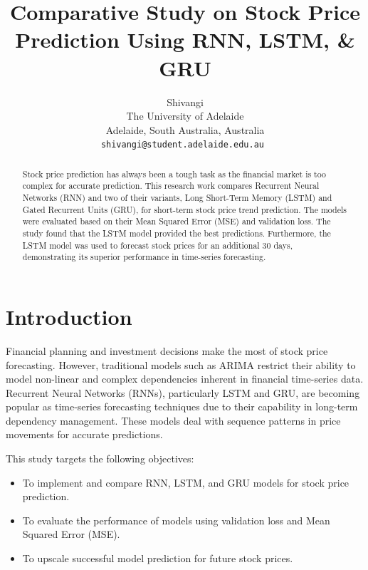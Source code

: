 \documentclass[10pt,twocolumn,a4paper]{article}
\begin{document}
\title{Comparative Study on Stock Price Prediction Using RNN, LSTM, \& GRU}

\author{
    Shivangi \\
    The University of Adelaide \\
    Adelaide, South Australia, Australia \\
    \tt\small shivangi@student.adelaide.edu.au
}

\date{}
\maketitle

\begin{abstract}
    Stock price prediction has always been a tough task as the financial market is too complex for accurate prediction. This research work compares Recurrent Neural Networks (RNN) and two of their variants, Long Short-Term Memory (LSTM) and Gated Recurrent Units (GRU), for short-term stock price trend prediction. The models were evaluated based on their Mean Squared Error (MSE) and validation loss. The study found that the LSTM model provided the best predictions. Furthermore, the LSTM model was used to forecast stock prices for an additional 30 days, demonstrating its superior performance in time-series forecasting.
\end{abstract}

\section{Introduction}
Financial planning and investment decisions make the most of stock price forecasting. However, traditional models such as ARIMA restrict their ability to model non-linear and complex dependencies inherent in financial time-series data. Recurrent Neural Networks (RNNs), particularly LSTM and GRU, are becoming popular as time-series forecasting techniques due to their capability in long-term dependency management. These models deal with sequence patterns in price movements for accurate predictions.

This study targets the following objectives:
\begin{itemize}
    \item To implement and compare RNN, LSTM, and GRU models for stock price prediction.
    \item To evaluate the performance of models using validation loss and Mean Squared Error (MSE).
    \item To upscale successful model prediction for future stock prices.
\end{itemize}
\end{document}
